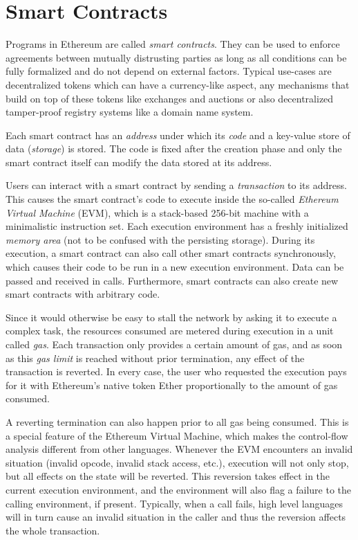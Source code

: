 \section{Smart Contracts}
\label{section:smart_contracts}

Programs in Ethereum are called \emph{smart contracts}.
They can be used to enforce agreements between
mutually distrusting parties as long as all conditions can be fully formalized
and do not depend on external factors. Typical use-cases are decentralized
tokens which can have a currency-like aspect, any mechanisms that build
on top of these tokens like exchanges and auctions or also decentralized
tamper-proof registry systems like a domain name system.

Each smart contract has an \emph{address} under which its \emph{code}
and a key-value store of data (\emph{storage}) is stored. The code is fixed after the creation phase
and only the smart contract itself can modify the data stored at its address.

Users can interact with a smart contract by sending a \emph{transaction}
to its address. This causes the smart contract's code to execute inside
the so-called \emph{Ethereum Virtual Machine} (EVM), which is a stack-based
256-bit machine with a minimalistic instruction set. Each execution environment
has a freshly initialized \emph{memory area} (not to be confused with the persisting
storage). During its execution, a smart contract can also call other
smart contracts synchronously, which causes their code to be run in
a new execution environment. Data can be passed and received in calls.
Furthermore, smart contracts can also create new smart contracts with
arbitrary code.

Since it would otherwise be easy to stall the network by asking it to
execute a complex task, the resources consumed are metered during execution
in a unit called \emph{gas}. Each transaction only provides a certain
amount of gas, and as soon as this \emph{gas limit} is reached without
prior termination, any effect of the transaction is reverted.
In every case, the user
who requested the execution pays for it with Ethereum's native token
Ether proportionally to the amount of gas consumed.

A reverting termination can also happen prior to all gas being consumed. This is
a special feature of the Ethereum Virtual Machine,
which makes the control-flow analysis different from other languages.
Whenever the EVM encounters an invalid situation (invalid opcode, invalid
stack access, etc.), execution will not only stop, but all effects on the
state will be reverted. This reversion takes effect in the current execution
environment, and the environment will also
flag a failure to the calling environment, if present. Typically,
when a call fails, high level languages will in turn cause an
invalid situation in the caller and thus the reversion
affects the whole transaction.

